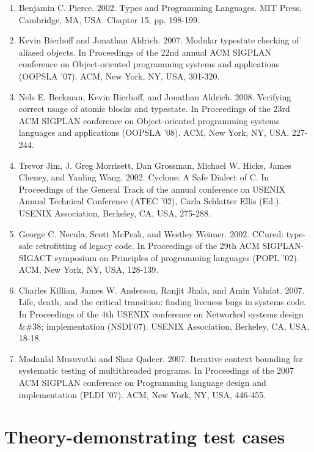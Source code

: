 \documentclass{article}
\begin{document}
\begin{enumerate}
	\item %
	Benjamin C. Pierce. 2002. Types and Programming Languages. MIT Press, Cambridge, MA, USA. Chapter 15, pp. 198-199.  %
	\item %
	Kevin Bierhoff and Jonathan Aldrich. 2007. Modular typestate checking of aliased objects. In Proceedings of the 22nd annual ACM SIGPLAN conference on Object-oriented programming systems and applications (OOPSLA '07). ACM, New York, NY, USA, 301-320. %
	\item %
	Nels E. Beckman, Kevin Bierhoff, and Jonathan Aldrich. 2008. Verifying correct usage of atomic blocks and typestate. In Proceedings of the 23rd ACM SIGPLAN conference on Object-oriented programming systems languages and applications (OOPSLA '08). ACM, New York, NY, USA, 227-244. %
	\item %
	Trevor Jim, J. Greg Morrisett, Dan Grossman, Michael W. Hicks, James Cheney, and Yanling Wang. 2002. Cyclone: A Safe Dialect of C. In Proceedings of the General Track of the annual conference on USENIX Annual Technical Conference (ATEC '02), Carla Schlatter Ellis (Ed.). USENIX Association, Berkeley, CA, USA, 275-288.  %
	\item %
	George C. Necula, Scott McPeak, and Westley Weimer. 2002. CCured: type-safe retrofitting of legacy code. In Proceedings of the 29th ACM SIGPLAN-SIGACT symposium on Principles of programming languages (POPL '02). ACM, New York, NY, USA, 128-139. %
	\item %
	Charles Killian, James W. Anderson, Ranjit Jhala, and Amin Vahdat. 2007. Life, death, and the critical transition: finding liveness bugs in systems code. In Proceedings of the 4th USENIX conference on Networked systems design \&\#38; implementation (NSDI'07). USENIX Association, Berkeley, CA, USA, 18-18. %
	\item %
	Madanlal Musuvathi and Shaz Qadeer. 2007. Iterative context bounding for systematic testing of multithreaded programs. In Proceedings of the 2007 ACM SIGPLAN conference on Programming language design and implementation (PLDI '07). ACM, New York, NY, USA, 446-455. %
\end{enumerate}

\appendix

\section{Theory-demonstrating test cases}
\end{document}
